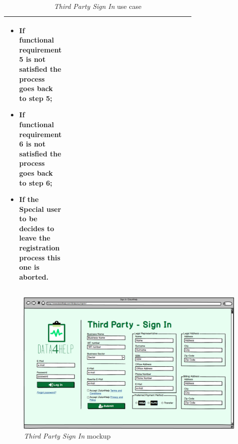 \begin{center}
\begin{table}
\begin{tabular}{ | l | p{0.75\linewidth} | }
\begin{minipage}[t]{0.7\textwidth}
\begin{itemize}
      \item If functional requirement 5 is not satisfied the process goes back to step 5;
      \item If functional requirement 6 is not satisfied the process goes back to step 6;
      \item If the \textbf{Special user to be} decides to leave the registration process this one is aborted.
    \end{itemize}
    \smallskip
  \end{minipage}  \\ \hline
\end{tabular}
\caption{\textit{Third Party Sign In} use case}
\label{table:thirdPartySignInTable}
\end{table}
\end{center}

\begin{figure}
\begin{center}
  \includegraphics[width=\textwidth]{img/mockup/ThirdParty_SingIn.png}
  \hspace{0.05\linewidth}
  \centering
  \caption{\textit{Third Party Sign In} mockup}
  \label{img:thirdPartySignInMockup}
\end{center}
\end{figure}
